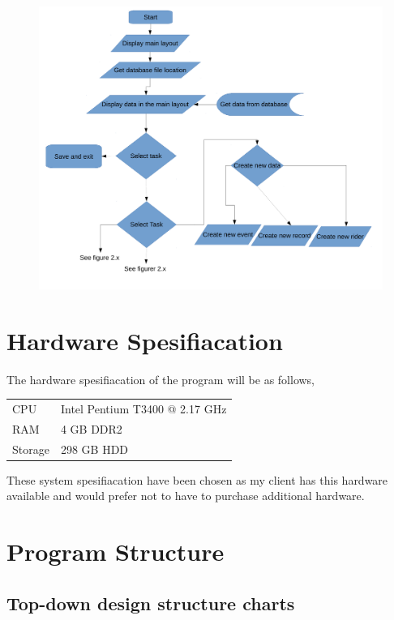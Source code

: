 \begin{figure}[H]
	\includegraphics[width=\textwidth]{./FlowChart/SectionOne.pdf}
	\caption{} \label{fig:} 	
\end{figure}

\section{Hardware Spesifiacation}

The hardware spesifiacation of the program will be as follows,

\begin{tabular}{ll}
CPU & Intel Pentium T3400 @ 2.17 GHz\\
RAM & 4 GB DDR2 \\
Storage & 298 GB HDD \\
\end{tabular}

These system spesifiacation have been chosen as my client has this hardware available and would prefer not to have to purchase additional hardware.

\section{Program Structure}

\subsection{Top-down design structure charts}


